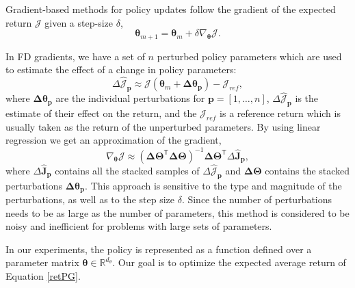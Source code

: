 \documentclass{aamas2016}
\renewcommand{\Re}{\mathbb{R}}
\newcommand{\transpose}{\text{$\mathsf{T}$}}
\begin{document}

Gradient-based methods for policy updates follow the gradient of the expected return $\mathcal{J}$ %
given a step-size $\delta$,
\begin{displaymath}
 \boldsymbol{\theta}_{m+1} = \boldsymbol{\theta}_{m}+\delta\nabla_{\boldsymbol{\theta}}\mathcal{J}.
\end{displaymath}

In FD gradients, we have a set of $n$ perturbed policy parameters which are used to estimate the effect of a change in policy parameters:
\begin{displaymath}
 \Delta\hat{\mathcal{J}}_{\mathbf{p}} \approx \mathcal{J}(\boldsymbol{\theta}_{m}+\boldsymbol{\Delta\theta_{p}}) - \mathcal{J}_{ref},
\end{displaymath}
where $\boldsymbol{\Delta\theta_{p}}$ are the individual perturbations for $\mathbf{p}=[1,\ldots,n]$, $\Delta\hat{\mathcal{J}}_{\mathbf{p}}$ is the estimate of their 
effect on the return, and the $\mathcal{J}_{ref}$ is a reference return which is usually taken as the return of the unperturbed
parameters. By using linear regression we get an approximation of the gradient,
\begin{displaymath}
 \nabla_{\boldsymbol{\theta}}\mathcal{J} \approx \left(\boldsymbol{\Delta\Theta^{\transpose}\Delta\Theta}\right)^{-1}\boldsymbol{\Delta\Theta}^{\transpose}\Delta\boldsymbol{\hat{J}_{p}},
\end{displaymath}
where $\Delta\boldsymbol{\hat{J}_{p}}$ contains all the stacked samples of $\Delta\hat{\mathcal{J}}_{\mathbf{p}}$ and  $\boldsymbol{\Delta\Theta}$
contains the stacked perturbations $\boldsymbol{\Delta\theta_{p}}$. This approach is sensitive to the type and magnitude of the perturbations, as well as
to the step size $\delta$. Since the number of perturbations needs to be as large as the number of parameters, this method is
considered to be noisy and inefficient for problems with large sets of parameters.%

In our experiments, the policy is represented as a function defined over a parameter matrix 
$\boldsymbol{\theta} \in \Re^{d_{\theta}}$. 
Our goal is to optimize the expected average return of Equation \ref{retPG}.
\end{document}

